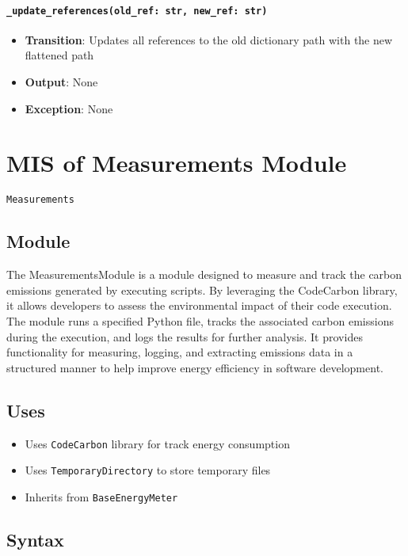 \documentclass[12pt, titlepage]{article}
\begin{document}
\paragraph{\texttt{\_update\_references(old\_ref: str, new\_ref: str)}}
\begin{itemize}
  \item \textbf{Transition}: Updates all references to the old dictionary path with the new flattened path
  \item \textbf{Output}: None
  \item \textbf{Exception}: None
\end{itemize}

\section{MIS of Measurements Module} \label{mis:measure}

\texttt{Measurements}

\subsection{Module}

The MeasurementsModule is a module designed to measure and track the carbon emissions generated by executing scripts. By leveraging the CodeCarbon library, it allows developers to assess the environmental impact of their code execution. The module runs a specified Python file, tracks the associated carbon emissions during the execution, and logs the results for further analysis. It provides functionality for measuring, logging, and extracting emissions data in a structured manner to help improve energy efficiency in software development.


\subsection{Uses}

\begin{itemize}
\item Uses \texttt{CodeCarbon} library for track energy consumption
\item Uses \texttt{TemporaryDirectory} to store temporary files
\item Inherits from \texttt{BaseEnergyMeter}
\end{itemize}

\subsection{Syntax}
\end{document}
